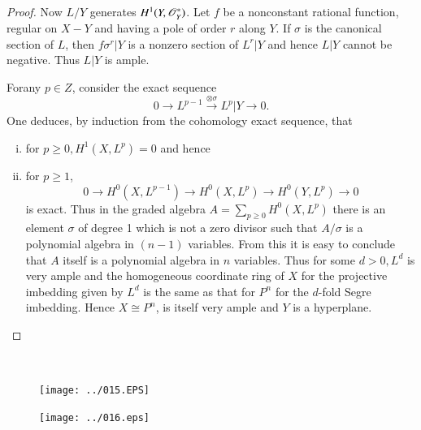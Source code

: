 \begin{enumerate}
\begin{proof}
Now $L/Y$ generates $H^1(Y,\mathscr{O}_Y^*)$. Let $f$ be a nonconstant 
rational function, regular on $X-Y$ and having a pole of order $r$ 
along $Y$. If $\sigma$ is the canonical section of $L$, then 
$f\sigma^r |Y$ is a nonzero section of $L^r | Y$ and hence $L|Y$ 
 cannot be negative. Thus $L|Y$ is ample. 
 
 For\pageoriginale any $p\in Z$, consider the exact sequence
 $$
 0\to L^{p-1} \xrightarrow{\otimes\sigma} L^p|Y\to 0.
 $$ 
 One deduces, by induction from the cohomology exact sequence, that
\begin{enumerate}[(i)]
\item for $p\geq 0, H^1(X,L^p)=0$ and hence
\item for $p\geq 1$,
$$
 0\to H^0(X, L^{p-1})\to H^0(X,L^p)\to H^0(Y,L^p) 
\to 0
$$ 
is exact. Thus in the graded algebra $A=\sum\limits_{p\geq 0} 
H^0(X,L^p)$ there is an element $\sigma$ of degree 1 which is not a zero 
divisor such that $A/\sigma$ is a polynomial algebra in $(n-1)$ 
variables. From this it is easy to conclude that $A$ itself is a 
polynomial algebra in $n$ variables. Thus for some $d>0, L^d$ is very 
ample and the homogeneous coordinate ring of $X$ for the projective 
imbedding given by $L^d$ is the same as that for $P^n$ for the 
$d$-fold Segre imbedding. Hence $X\cong P^n$, is itself very ample and 
$Y$ is a hyperplane.  
\end{enumerate} 
\end{proof}
\end{enumerate}

\vfill\eject
~\phantom{a}
\thispagestyle{empty}

\vfill\eject

\thispagestyle{empty}

\begin{figure}[H]
\centering
\texttt{[image: ../015.EPS]}
\end{figure}

\newpage

\thispagestyle{empty}

\begin{figure}[H]
\centering
\texttt{[image: ../016.eps]}
\end{figure}

\newpage

